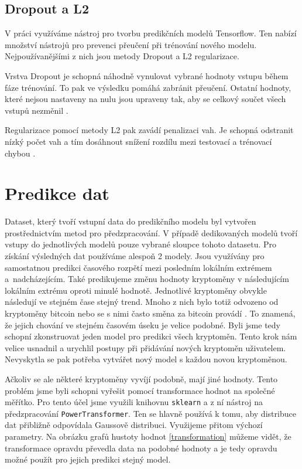 \subsection{Dropout a L2}

V práci využíváme nástroj pro tvorbu predikčních modelů Tensorflow. Ten nabízí množství nástrojů pro prevenci přeučení při trénování nového modelu. Nejpoužívanějšími z nich jsou metody Dropout a L2 regularizace. 

Vrstva Dropout je schopná náhodně vynulovat vybrané hodnoty vstupu během fáze trénování. To pak ve výsledku pomáhá zabránit přeučení. Ostatní hodnoty, které nejsou nastaveny na nulu jsou upraveny tak, aby se celkový součet všech vstupů nezměnil \cite{dropout}. 

Regularizace pomocí metody L2 pak zavádí penalizaci vah. Je schopná odstranit nízký počet vah a tím dosáhnout snížení rozdílu mezi testovací a trénovací chybou \cite{l2}.

\section{Predikce dat}

Dataset, který tvoří vstupní data do predikčního modelu byl vytvořen prostřednictvím metod pro předzpracování.
V případě dedikovaných modelů tvoří vstupy do jednotlivých modelů pouze vybrané sloupce tohoto datasetu.
Pro získání výsledných dat používáme alespoň 2 modely. 
Jsou využívány pro samostatnou predikci časového rozpětí mezi posledním lokálním extrémem a~nadcházejícím. 
Také predikujeme změnu hodnoty kryptoměny v následujícím lokálním extrému oproti minulé hodnotě. 
Jednotlivé kryptoměny obvykle následují ve stejném čase stejný trend. 
Mnoho z nich bylo totiž odvozeno od kryptoměny bitcoin nebo se s nimi často směna za bitcoin provádí \cite{btc-influence}.
To znamená, že jejich chování ve stejném časovém úseku je velice podobné. 
Byli jsme tedy schopní zkonstruovat jeden model pro predikci všech kryptoměn. 
Tento krok nám velice usnadnil a urychlil postupy při přidávání nových kryptoměn uživatelem. 
Nevyskytla se pak potřeba vytvářet nový model s každou novou kryptoměnou. 

Ačkoliv se ale některé kryptoměny vyvíjí podobně, mají jiné hodnoty. 
Tento problém jsme byli schopni vyřešit pomocí transformace hodnot na společné měřítko. 
Pro tento účel jsme využili knihovnu \verb|sklearn| a z ní nástroj na předzpracování \verb|PowerTransformer|. 
Ten se hlavně používá k tomu, aby distribuce dat přibližně odpovídala Gaussově distribuci. 
Využijeme přitom výchozí parametry. 
Na obrázku grafů hustoty hodnot \ref{transformation} můžeme vidět, že transformace opravdu převedla data na podobné hodnoty a je tedy opravdu možné použít pro jejich predikci stejný model.

